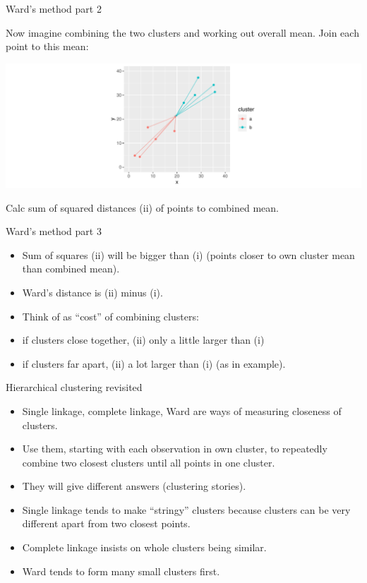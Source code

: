 \documentclass[
  ignorenonframetext,
]{beamer}
\begin{document}
\begin{frame}{Ward's method part 2}
\protect\hypertarget{wards-method-part-2}{}

Now imagine combining the two clusters and working out overall mean.
Join each point to this mean:

\includegraphics{slides_d29_files/figure-beamer/unnamed-chunk-356-1.pdf}

Calc sum of squared distances (ii) of points to combined mean.

\end{frame}

\begin{frame}{Ward's method part 3}
\protect\hypertarget{wards-method-part-3}{}

\begin{itemize}
\item
  Sum of squares (ii) will be bigger than (i) (points closer to own
  cluster mean than combined mean).
\item
  Ward's distance is (ii) minus (i).
\item
  Think of as ``cost'' of combining clusters:
\item
  if clusters close together, (ii) only a little larger than (i)
\item
  if clusters far apart, (ii) a lot larger than (i) (as in example).
\end{itemize}

\end{frame}

\begin{frame}{Hierarchical clustering revisited}
\protect\hypertarget{hierarchical-clustering-revisited}{}

\begin{itemize}
\item
  Single linkage, complete linkage, Ward are ways of measuring closeness
  of clusters.
\item
  Use them, starting with each observation in own cluster, to repeatedly
  combine two closest clusters until all points in one cluster.
\item
  They will give different answers (clustering stories).
\item
  Single linkage tends to make ``stringy'' clusters because clusters can
  be very different apart from two closest points.
\item
  Complete linkage insists on whole clusters being similar.
\item
  Ward tends to form many small clusters first.
\end{itemize}

\end{frame}
\end{document}
